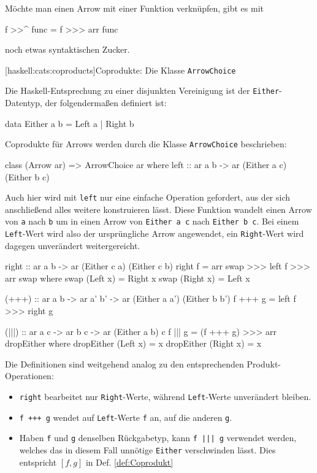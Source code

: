 \documentclass[12pt, a4paper, bibgerm]{scrbook}
\newenvironment{DIFnomarkup}{}{}
\newcommand\icode[1]{\lstinline?#1?}
\newcommand\lsubsection{}
\newcommand{\dref}[1]{Def. \ref{def:#1}}
\begin{document}
Möchte man einen Arrow mit einer Funktion verknüpfen, gibt es mit
\begin{DIFnomarkup}\begin{code}
f >>^ func = f >>> arr func
\end{code}\end{DIFnomarkup}%
noch etwas syntaktischen Zucker.

\lsubsection[haskell:cats:coproducts]{Coprodukte: Die Klasse \texttt{ArrowChoice}}

Die Haskell-Entsprechung zu einer disjunkten Vereinigung ist der
\icode{Either}-Datentyp, der folgendermaßen definiert ist:
\begin{DIFnomarkup}\begin{code}
data Either a b = Left a | Right b
\end{code}\end{DIFnomarkup}
Coprodukte für Arrows werden durch die Klasse \icode{ArrowChoice} beschrieben:
\begin{DIFnomarkup}\begin{code}
class (Arrow ar) => ArrowChoice ar where
  left :: ar a b -> ar (Either a c) (Either b c)
\end{code}\end{DIFnomarkup}
Auch hier wird mit \icode{left} nur eine einfache Operation gefordert,
aus der sich anschließend alles weitere konstruieren lässt. Diese
Funktion wandelt einen Arrow von \icode{a} nach \icode{b} um in
einen Arrow von \icode{Either a c} nach \icode{Either b c}. Bei einem
\icode{Left}-Wert wird also der ursprüngliche Arrow angewendet, ein
\icode{Right}-Wert wird dagegen unverändert weitergereicht.
\begin{DIFnomarkup}\begin{code}
  right :: ar a b -> ar (Either c a) (Either c b)
  right f = arr swap >>> left f >>> arr swap
    where swap (Left x)  = Right x
          swap (Right x) = Left x

  (+++) :: ar a b -> ar a' b' -> ar (Either a a') (Either b b')
  f +++ g = left f >>> right g

  (|||) :: ar a c -> ar b c -> ar (Either a b) c
  f ||| g = (f +++ g) >>> arr dropEither
    where dropEither (Left x)  = x
          dropEither (Right x) = x

\end{code}\end{DIFnomarkup} %
Die Definitionen sind weitgehend analog zu den entsprechenden
Produkt-Operationen:
\begin{itemize}
\item \icode{right} bearbeitet nur \icode{Right}-Werte, während
  \icode{Left}-Werte unverändert bleiben.
\item \icode{f +++ g} wendet auf \icode{Left}-Werte \icode{f} an, auf
  die anderen \icode{g}.
\item Haben \icode{f} und \icode{g} denselben Rückgabetyp, kann
  \icode{f ||| g} verwendet werden, welches das in diesem Fall unnötige
  \icode{Either} verschwinden lässt. Dies entspricht $[f,g]$ in
  \dref{Coprodukt}
\end{itemize}
\end{document}
